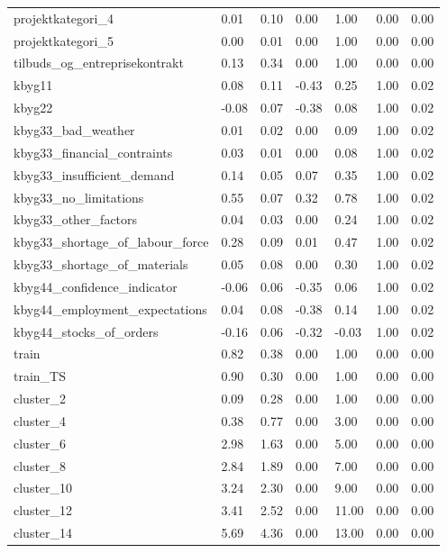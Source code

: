 \begin{landscape}
\begin{longtable}[h!]{lllllll}
projektkategori_4 & 0.01 & 0.10 & 0.00 & 1.00 & 0.00 & 0.00 \\
projektkategori_5 & 0.00 & 0.01 & 0.00 & 1.00 & 0.00 & 0.00 \\
tilbuds_og_entreprisekontrakt & 0.13 & 0.34 & 0.00 & 1.00 & 0.00 & 0.00 \\
kbyg11 & 0.08 & 0.11 & -0.43 & 0.25 & 1.00 & 0.02 \\
kbyg22 & -0.08 & 0.07 & -0.38 & 0.08 & 1.00 & 0.02 \\
kbyg33_bad_weather & 0.01 & 0.02 & 0.00 & 0.09 & 1.00 & 0.02 \\
kbyg33_financial_contraints & 0.03 & 0.01 & 0.00 & 0.08 & 1.00 & 0.02 \\
kbyg33_insufficient_demand & 0.14 & 0.05 & 0.07 & 0.35 & 1.00 & 0.02 \\
kbyg33_no_limitations & 0.55 & 0.07 & 0.32 & 0.78 & 1.00 & 0.02 \\
kbyg33_other_factors & 0.04 & 0.03 & 0.00 & 0.24 & 1.00 & 0.02 \\
kbyg33_shortage_of_labour_force & 0.28 & 0.09 & 0.01 & 0.47 & 1.00 & 0.02 \\
kbyg33_shortage_of_materials & 0.05 & 0.08 & 0.00 & 0.30 & 1.00 & 0.02 \\
kbyg44_confidence_indicator & -0.06 & 0.06 & -0.35 & 0.06 & 1.00 & 0.02 \\
kbyg44_employment_expectations & 0.04 & 0.08 & -0.38 & 0.14 & 1.00 & 0.02 \\
kbyg44_stocks_of_orders & -0.16 & 0.06 & -0.32 & -0.03 & 1.00 & 0.02 \\
train & 0.82 & 0.38 & 0.00 & 1.00 & 0.00 & 0.00 \\
train_TS & 0.90 & 0.30 & 0.00 & 1.00 & 0.00 & 0.00 \\
cluster_2 & 0.09 & 0.28 & 0.00 & 1.00 & 0.00 & 0.00 \\
cluster_4 & 0.38 & 0.77 & 0.00 & 3.00 & 0.00 & 0.00 \\
cluster_6 & 2.98 & 1.63 & 0.00 & 5.00 & 0.00 & 0.00 \\
cluster_8 & 2.84 & 1.89 & 0.00 & 7.00 & 0.00 & 0.00 \\
cluster_10 & 3.24 & 2.30 & 0.00 & 9.00 & 0.00 & 0.00 \\
cluster_12 & 3.41 & 2.52 & 0.00 & 11.00 & 0.00 & 0.00 \\
cluster_14 & 5.69 & 4.36 & 0.00 & 13.00 & 0.00 & 0.00 \\
\end{longtable}\end{landscape}
